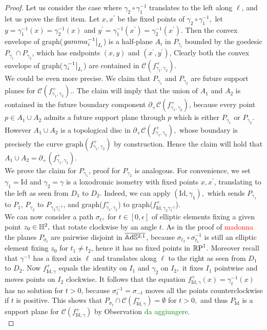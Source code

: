 \begin{proof}
    Let us consider the case where $\gamma_2\circ\gamma_1^{-1}$ translates to the left along $\ell$, and let us prove the first item. Let $x,x^{\prime}$ be the fixed points of $\gamma_2\circ\gamma_1^{-1},$ let $y=\gamma_1^{-1}(x)=\gamma_2^{-1}(x)$ and $y^{\prime}=\gamma_1^{-1}(x^{\prime})=\gamma_2^{-1}(x^{\prime})$. Then the convex envelope of graph($\restr{gamma_i^{-1}}{I_i}$) is a half-plane $A_i$ in $P_{\gamma_i}$ bounded by the goedesic $P_{\gamma_1}\cap P_{\gamma_2}$, which has endpoints $(x,y)$ and $(x^{\prime} ,y^{\prime})$, Clearly both the convex envelope of graph($\restr{\gamma_i^{-1}}{I_i}$) are contained in $\mathcal{C}(f_{\gamma_1,\gamma_2}^{+}).$\\
    We could be even more precise. We claim that $P_{\gamma_1}$ and $P_{\gamma_2}$ are future support planes for $\mathcal{C}(f_{\gamma_1,\gamma_2}^{+}).$. The claim will imply that the union of $A_1$ and $A_2$ is contained in the future boundary component $\partial_+\mathcal{C}(f_{\gamma_1,\gamma_2}^{+})$, because every point $p\in A_1\cup A_2$ admits a future support plane through $p$ which is either $P_{\gamma_1}$ or $P_{\gamma_2}$. However $A_1\cup A_2$ is a topological disc in $\partial_+\mathcal{C}(f_{\gamma_1,\gamma_2}^{+}),$ whose boundary is precisely the curve $\text{graph}(f_{\gamma_1,\gamma_2}^{+})$ by construction. Hence the claim will hold that $A_1\cup A_2=\partial_+(f_{\gamma_1,\gamma_2}^{+}).$\\
    We prove the claim for $P_{\gamma_1}$, proof for $P_{\gamma_2}$ is analogous. For convenience, we set $\gamma_1=\text{Id}$ and $\gamma_2=\gamma$ is a loxodromic isometry with fixed points $x,x^{\prime}$, translating to the left as seen from $D_1$ to $D_2$. Indeed, we can apply $(\text{Id},\gamma_1),$ which sends $P_{\gamma_1}$ to $P_1$, $P_{\gamma_2}$ to $P_{\gamma_2\gamma_1^{-1}}$, and graph($f_{\gamma_1,\gamma_2}^+$) to graph($f_{\text{Id},\gamma_2\gamma_1^{-1}}^+$). \\
    We can now consider a path $\sigma_t,$ for $t\in[0,\epsilon]$ of elliptic elements fixing a given point $z_0\in\H^2,$ that rotate clockwise by an angle $t.$ As in the proof of \textcolor{red}{madonna} the planes $P_{\sigma_t}$ are pairwise disjoint in $\overline{\A^{2,1}}$, because $\sigma_{t_2}\circ\sigma_{t_1}^{-1}$ is still an elliptic element fixing $z_0$ for $t_1\neq t_2$, hence it has no fixed points in $\S$. Moreover recall that $\gamma^{-1}$ has a fixed axis $\ell$ and translates along $\ell$ to the right as seen from $D_1$ to $D_2$. Now $f_{\text{Id},\gamma}^+$ equals the identity on $I_1$ and $\gamma_2$ on $I_2,$ it fixes $I_1$ pointwise and moves points on $I_2$ clockwise. It follows that the equation $f_{\text{Id},\gamma}^+(x)=\gamma_t^{-1}(x)$ has no solution for $t>0$, because $\sigma_{t}^{-1}=\sigma_{-t}$ moves all the points counterclockwise if $t$ is positive. This shows that $P_{\sigma_t}\cap\mathcal{C}(f^+_{\text{Id},\gamma})=\emptyset$ for $t>0,$ and thus $P_{\text{Id}}$ is a support plane for $\mathcal{C}(f^+_{\text{Id},\gamma})$ by Observation \textcolor{green}{da aggiungere}.\\

\end{proof}
